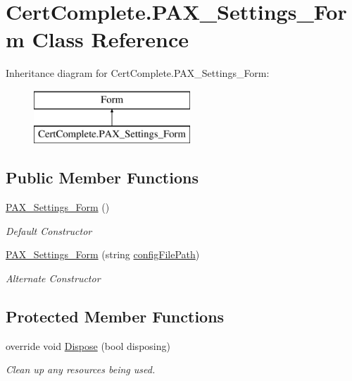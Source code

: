 \hypertarget{class_cert_complete_1_1_p_a_x___settings___form}{}\section{Cert\+Complete.\+P\+A\+X\+\_\+\+Settings\+\_\+\+Form Class Reference}
\label{class_cert_complete_1_1_p_a_x___settings___form}
Inheritance diagram for Cert\+Complete.\+P\+A\+X\+\_\+\+Settings\+\_\+\+Form\+:\begin{figure}[H]
\begin{center}
\leavevmode
\includegraphics[height=2.000000cm]{class_cert_complete_1_1_p_a_x___settings___form}
\end{center}
\end{figure}
\subsection*{Public Member Functions}
\begin{DoxyCompactItemize}
\item 
\mbox{\hyperlink{class_cert_complete_1_1_p_a_x___settings___form_aff958ced6137ee535b58d3f21feddd4a}{P\+A\+X\+\_\+\+Settings\+\_\+\+Form}} ()
\begin{DoxyCompactList}\small\item\em Default Constructor \end{DoxyCompactList}\item 
\mbox{\hyperlink{class_cert_complete_1_1_p_a_x___settings___form_a454f2e2815f73479a5ae11e42a20eb3c}{P\+A\+X\+\_\+\+Settings\+\_\+\+Form}} (string \mbox{\hyperlink{class_cert_complete_1_1_p_a_x___settings___form_ae9e9f23bde388716bca04462ee747870}{config\+File\+Path}})
\begin{DoxyCompactList}\small\item\em Alternate Constructor \end{DoxyCompactList}\end{DoxyCompactItemize}
\subsection*{Protected Member Functions}
\begin{DoxyCompactItemize}
\item 
override void \mbox{\hyperlink{class_cert_complete_1_1_p_a_x___settings___form_aa9d3a7d045bac1c1f81ab4d27e3e6437}{Dispose}} (bool disposing)
\begin{DoxyCompactList}\small\item\em Clean up any resources being used. \end{DoxyCompactList}\end{DoxyCompactItemize}
